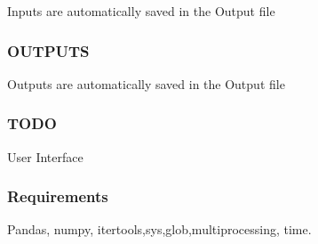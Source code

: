 Inputs are automatically saved in the \textquotesingle{}Output\textquotesingle{} file \subsubsection*{O\+U\+T\+P\+U\+TS }

Outputs are automatically saved in the \textquotesingle{}Output\textquotesingle{} file \subsubsection*{T\+O\+DO }

User Interface \subsubsection*{Requirements }

Pandas, numpy, itertools,sys,glob,multiprocessing, time. 